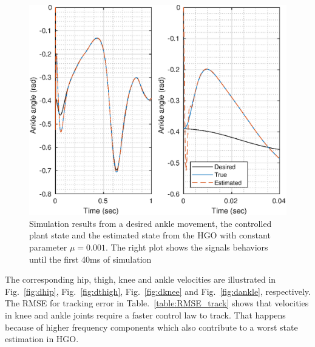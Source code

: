 \documentclass[letterpaper, 10 pt, conference]{ieeeconf}  %
\theoremstyle{plain}
\theoremstyle{definition}
\theoremstyle{remark}
\begin{document}
%
%
\begin{figure}[h!]
	\begin{center}
	\includegraphics[width = \columnwidth]{Figs/q_ankle_mu_1e-03.eps}
	\caption{ Simulation results from a desired ankle movement, the controlled plant state and the estimated state from the HGO with constant parameter $\mu=0.001$. The right plot shows the signals behaviors until the first 40ms of simulation}
	\label{fig:ankle}
	\end{center}
\end{figure}
%
%
%
%
The corresponding hip, thigh, knee and ankle velocities are illustrated in Fig.~\ref{fig:dhip}, Fig.~\ref{fig:dthigh}, Fig.~\ref{fig:dknee} and Fig.~\ref{fig:dankle}, respectively. The RMSE for tracking error in Table.~\ref{table:RMSE_track} shows that velocities in knee and ankle joints require a faster control law to track. That happens because of higher frequency components which also contribute to a worst state estimation in HGO.
%
%
\end{document}
